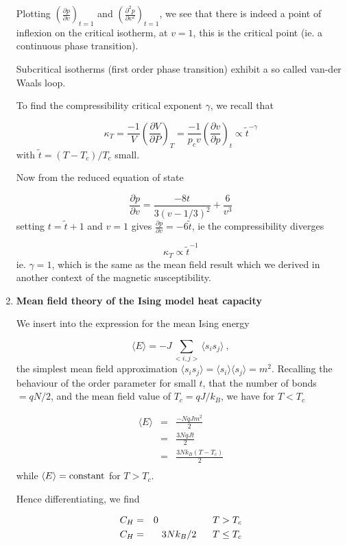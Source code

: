 \documentclass[a4paper,12pt,twoside]{article}
\begin{document}
\begin{enumerate}
Plotting $(\frac{\partial p}{\partial v})_{t=1}$ and $(\frac{\partial^2 p}{\partial
v^2})_{t=1}$, we see that there is indeed a point of inflexion on the
critical isotherm, at $v=1$, this is the critical point (ie. a continuous
phase transition).

Subcritical isotherms (first order phase transition) exhibit a so called
van-der Waals loop. 

To find the compressibility critical exponent $\gamma$, we recall that

\[
\kappa_T=\frac{-1}{V}\left(\frac{\partial V}{\partial P}\right)_T=\frac{-1}{p_cv}\left(\frac{\partial v}{\partial p}\right)_t\propto \tilde{t}^{-\gamma}
\]
with $\tilde{t}=(T-T_c)/T_c$ small.

Now from the reduced equation of state

\[
\frac{\partial p}{\partial v}=\frac{-8t}{3(v-1/3)^2}+\frac{6}{v^3}
\]
setting $t=\tilde{t}+1$ and $v=1$ gives $\frac{\partial p}{\partial v} =-6\tilde{t}$, ie the
compressibility diverges 

\[
\kappa_T\propto \tilde{t}^{-1}
\]
ie. $\gamma=1$, which is the same as the mean field result which we
derived in another context of the magnetic susceptibility.

\item {\bf Mean field theory of the Ising model heat capacity}

We insert into the expression for the mean Ising energy

\[
\langle E \rangle =-J\sum_{<i,j>}\langle s_is_j\rangle\:, 
\]
the simplest mean field approximation $\langle s_is_j\rangle=\langle s_i\rangle\langle s_j\rangle=m^2$.
Recalling the behaviour of the order parameter for small $t$, that 
the number of bonds $=qN/2$, and the mean field value
of $T_c=qJ/k_B$, we have for $T<T_c$

\begin{eqnarray*}
\langle E \rangle &=& \frac{-NqJm^2}{2}\\
\:                &=& \frac{3NqJt}{2}\\
\:                &=& \frac{3Nk_B(T-T_c)}{2}\\
\end{eqnarray*}
while $\langle E \rangle= {\rm constant}$ for $T>T_c$.

Hence differentiating, we find

\begin{eqnarray*}
C_H&=& 0 \hspace*{20mm} T>T_c\\
C_H&=& 3Nk_B/2 \hspace*{6mm} T\le T_c
\end{eqnarray*}


\end{enumerate}
\end{document}
